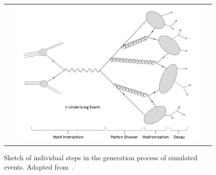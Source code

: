 \begin{figure}[!tp]
  \centering
  \begin{tabular}{c}
    \includegraphics[width=0.9\textwidth]{figures/MCGeneration.png} 
  \end{tabular}
  \caption{Sketch of individual steps in the generation process of simulated events. Adapted from~\cite{bib:hepmc}.}
  \label{fig:mc_gen}
\end{figure}
